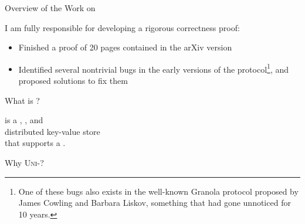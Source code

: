 \begin{frame}{Overview of the Work on \unistore}
  \begin{center}
    \vspace{0.20cm}

    \pause
    \vspace{0.80cm}
    \noindent I am fully responsible for developing a rigorous correctness proof: \\[3pt]

    \pause
    \begin{itemize}[<+->]
      \item Finished a proof of 20 pages contained in the \textsf{arXiv} version
      \item Identified several nontrivial bugs in the early versions of the
            protocol\footnote{ One of these bugs also exists in the well-known Granola
              protocol proposed by James Cowling and Barbara Liskov, something that had gone
              unnoticed for 10 years.}, and proposed solutions to fix them
    \end{itemize}
  \end{center}
\end{frame}

\begin{frame}{What is \unistore?}
  \begin{center}
    \unistore{} is a , , and  \\[8pt]
     distributed key-value store \\[8pt]
    that supports a .
  \end{center}
\end{frame}

\begin{frame}{Why \textsc{Uni-}?}
  \begin{center}


  \end{center}
\end{frame}

